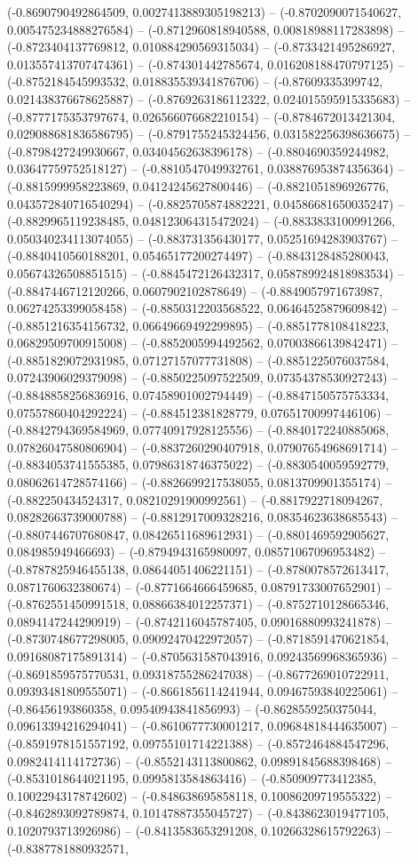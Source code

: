 (-0.8690790492864509, 0.0027413889305198213) -- (-0.8702090071540627, 0.005475234888276584) -- (-0.8712960818940588, 0.00818988117283898) -- (-0.8723404137769812, 0.010884290569315034) -- (-0.8733421495286927, 0.013557413707474361) -- (-0.874301442785674, 0.016208188470797125) -- (-0.8752184545993532, 0.018835539341876706) -- (-0.87609335399742, 0.021438376678625887) -- (-0.8769263186112322, 0.024015595915335683) -- (-0.8777175353797674, 0.026566076682210154) -- (-0.8784672013421304, 0.029088681836586795) -- (-0.8791755245324456, 0.031582256398636675) -- (-0.8798427249930667, 0.03404562638396178) -- (-0.8804690359244982, 0.03647759752518127) -- (-0.8810547049932761, 0.038876953874356364) -- (-0.8815999958223869, 0.04124245627800446) -- (-0.8821051896926776, 0.043572840716540294) -- (-0.8825705874882221, 0.04586681650035247) -- (-0.8829965119238485, 0.048123064315472024) -- (-0.8833833100991266, 0.050340234113074055) -- (-0.883731356430177, 0.05251694283903767) -- (-0.8840410560188201, 0.05465177200274497) -- (-0.8843128485280043, 0.05674326508851515) -- (-0.8845472126432317, 0.058789924818983534) -- (-0.8847446712120266, 0.0607902102878649) -- (-0.8849057971673987, 0.06274253399058458) -- (-0.8850312203568522, 0.06464525879609842) -- (-0.8851216354156732, 0.06649669492299895) -- (-0.8851778108418223, 0.06829509700915008) -- (-0.8852005994492562, 0.07003866139842471) -- (-0.8851829072931985, 0.07127157077731808) -- (-0.8851225076037584, 0.07243906029379098) -- (-0.8850225097522509, 0.07354378530927243) -- (-0.8848858256836916, 0.07458901002794449) -- (-0.8847150575753334, 0.07557860404292224) -- (-0.884512381828779, 0.07651700997446106) -- (-0.8842794369584969, 0.07740917928125556) -- (-0.8840172240885068, 0.07826047580806904) -- (-0.8837260290407918, 0.07907654968691714) -- (-0.8834053741555385, 0.07986318746375022) -- (-0.8830540059592779, 0.08062614728574166) -- (-0.8826699217538055, 0.0813709901355174) -- (-0.882250434524317, 0.08210291900992561) -- (-0.8817922718094267, 0.08282663739000788) -- (-0.8812917009328216, 0.08354623638685543) -- (-0.8807446707680847, 0.08426511689612931) -- (-0.8801469592905627, 0.084985949466693) -- (-0.8794943165980097, 0.08571067096953482) -- (-0.8787825946455138, 0.08644051406221151) -- (-0.8780078572613417, 0.0871760632380674) -- (-0.8771664666459685, 0.08791733007652901) -- (-0.8762551450991518, 0.08866384012257371) -- (-0.8752710128665346, 0.0894147244290919) -- (-0.8742116045787405, 0.09016880993241878) -- (-0.8730748677298005, 0.09092470422972057) -- (-0.8718591470621854, 0.09168087175891314) -- (-0.8705631587043916, 0.09243569968365936) -- (-0.8691859575770531, 0.09318755286247038) -- (-0.8677269010722911, 0.09393481809555071) -- (-0.8661856114241944, 0.09467593840225061) -- (-0.86456193860358, 0.09540943841856993) -- (-0.8628559250375044, 0.09613394216294041) -- (-0.8610677730001217, 0.09684818444635007) -- (-0.8591978151557192, 0.09755101714221388) -- (-0.8572464884547296, 0.0982414114172736) -- (-0.8552143113800862, 0.09891845688398468) -- (-0.8531018644021195, 0.0995813584863416) -- (-0.850909773412385, 0.10022943178742602) -- (-0.848638695858118, 0.10086209719555322) -- (-0.8462893092789874, 0.10147887355045727) -- (-0.8438623019477105, 0.1020793713926986) -- (-0.8413583653291208, 0.10266328615792263) -- (-0.8387781880932571, 